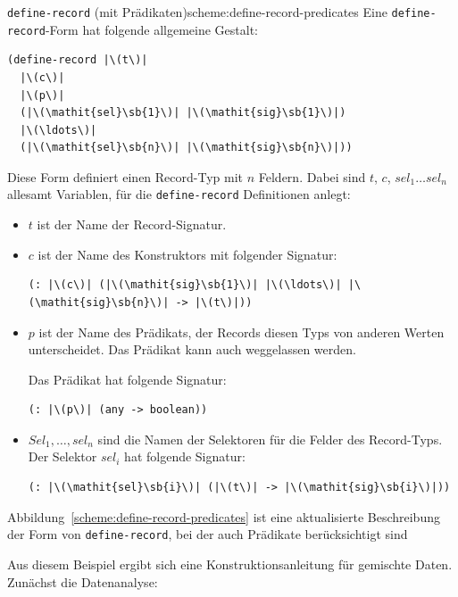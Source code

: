 \begin{feature}{\texttt{define-record} (mit Prädikaten)}{scheme:define-record-predicates}
Eine \lstinline{define-record}-Form
hat folgende allgemeine Gestalt:
%
\begin{lstlisting}
(define-record |\(t\)|
  |\(c\)|
  |\(p\)|
  (|\(\mathit{sel}\sb{1}\)| |\(\mathit{sig}\sb{1}\)|)
  |\(\ldots\)|
  (|\(\mathit{sel}\sb{n}\)| |\(\mathit{sig}\sb{n}\)|))
\end{lstlisting}
%
Diese Form definiert einen Record-Typ mit $n$ Feldern.
Dabei sind $t$, $c$, $\mathit{sel}_1 \ldots \mathit{sel}_n$ allesamt Variablen, für die
\lstinline{define-record} Definitionen anlegt:
%
\begin{itemize}
\item $t$ ist der Name der Record-Signatur.
\item $c$ ist der Name des Konstruktors mit 
  folgender Signatur:
%  
\begin{lstlisting}
(: |\(c\)| (|\(\mathit{sig}\sb{1}\)| |\(\ldots\)| |\(\mathit{sig}\sb{n}\)| -> |\(t\)|))
\end{lstlisting}
\item $p$ ist der Name des Prädikats, der Records diesen Typs von
  anderen Werten unterscheidet.  Das Prädikat kann auch weggelassen
  werden.

    Das Prädikat hat folgende Signatur:
\begin{lstlisting}
(: |\(p\)| (any -> boolean))
\end{lstlisting}
\item $\mathit{Sel}_1, \ldots, \mathit{sel}_n$ sind die Namen der Selektoren für die Felder
  des Record-Typs.  Der Selektor $\mathit{sel}_i$ hat folgende Signatur:
% 
\begin{lstlisting}
(: |\(\mathit{sel}\sb{i}\)| (|\(t\)| -> |\(\mathit{sig}\sb{i}\)|))
\end{lstlisting}
\end{itemize}
%
\end{feature}
%
Abbildung~\ref{scheme:define-record-predicates} ist eine
aktualisierte Beschreibung der Form von
\lstinline{define-record}, bei der auch Prädikate
berücksichtigt sind

Aus diesem Beispiel ergibt sich eine Konstruktionsanleitung für
gemischte Daten.  Zunächst die Datenanalyse:

